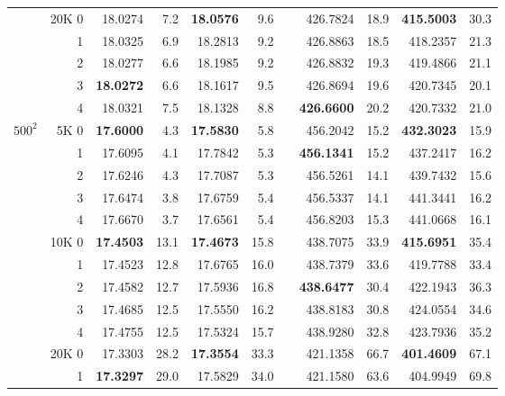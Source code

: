 \begin{table}[p!]
{\begin{tabular*}{\hsize}{crrrrrlrrrr}
\cline{2-11}
        & 20K 0 &      18.0274  &  7.2 & {\bf 18.0576} &  9.6 &  &      426.7824  &  18.9 & {\bf 415.5003} &  30.3 \\
        &     1 &      18.0325  &  6.9 &      18.2813  &  9.2 &  &      426.8863  &  18.5 &      418.2357  &  21.3 \\
        &     2 &      18.0277  &  6.6 &      18.1985  &  9.2 &  &      426.8832  &  19.3 &      419.4866  &  21.1 \\
        &     3 & {\bf 18.0272} &  6.6 &      18.1617  &  9.5 &  &      426.8694  &  19.6 &      420.7345  &  20.1 \\
        &     4 &      18.0321  &  7.5 &      18.1328  &  8.8 &  & {\bf 426.6600} &  20.2 &      420.7332  &  21.0 \\
\hline
$500^2$ &  5K 0 & {\bf 17.6000} &  4.3 & {\bf 17.5830} &  5.8 &  &      456.2042  &  15.2 & {\bf 432.3023} &  15.9 \\
        &     1 &      17.6095  &  4.1 &      17.7842  &  5.3 &  & {\bf 456.1341} &  15.2 &      437.2417  &  16.2 \\
        &     2 &      17.6246  &  4.3 &      17.7087  &  5.3 &  &      456.5261  &  14.1 &      439.7432  &  15.6 \\
        &     3 &      17.6474  &  3.8 &      17.6759  &  5.4 &  &      456.5337  &  14.1 &      441.3441  &  16.2 \\
        &     4 &      17.6670  &  3.7 &      17.6561  &  5.4 &  &      456.8203  &  15.3 &      441.0668  &  16.1 \\
\cline{2-11}
        & 10K 0 & {\bf 17.4503} & 13.1 & {\bf 17.4673} & 15.8 &  &      438.7075  &  33.9 & {\bf 415.6951} &  35.4 \\
        &     1 &      17.4523  & 12.8 &      17.6765  & 16.0 &  &      438.7379  &  33.6 &      419.7788  &  33.4 \\
        &     2 &      17.4582  & 12.7 &      17.5936  & 16.8 &  & {\bf 438.6477} &  30.4 &      422.1943  &  36.3 \\
        &     3 &      17.4685  & 12.5 &      17.5550  & 16.2 &  &      438.8183  &  30.8 &      424.0554  &  34.6 \\
        &     4 &      17.4755  & 12.5 &      17.5324  & 15.7 &  &      438.9280  &  32.8 &      423.7936  &  35.2 \\
\cline{2-11}
        & 20K 0 &      17.3303  & 28.2 & {\bf 17.3554} & 33.3 &  &      421.1358  &  66.7 & {\bf 401.4609} &  67.1 \\
        &     1 & {\bf 17.3297} & 29.0 &      17.5829  & 34.0 &  &      421.1580  &  63.6 &      404.9949  &  69.8 \\

\end{tabular*}}
\end{table}

